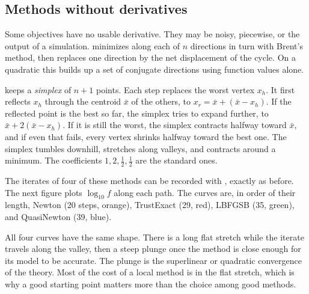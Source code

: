 \subsection{Methods without derivatives}

Some objectives have no usable derivative. They may be noisy, piecewise, or
the output of a simulation.  minimizes along each of \(n\)
directions in turn with Brent's method, then replaces one direction by the net
displacement of the cycle. On a quadratic this builds up a set of conjugate
directions using function values alone.

 keeps a \emph{simplex} of
\(n + 1\) points. Each step replaces the worst vertex \(x_h\). It first
reflects \(x_h\) through the centroid \(\bar x\) of the others, to
\(x_r = \bar x + (\bar x - x_h)\). If the reflected point is the best so far,
the simplex tries to expand further, to \(\bar x + 2(\bar x - x_h)\). If it is
still the worst, the simplex contracts halfway toward \(\bar x\), and if even
that fails, every vertex shrinks halfway toward the best one. The simplex
tumbles downhill, stretches along valleys, and contracts around a minimum. The
coefficients \(1, 2, \tfrac12, \tfrac12\) are the standard ones.

\begin{codepairs}
\end{codepairs}

The iterates of four of these methods can be recorded with ,
exactly as before. The next figure plots \(\log_{10} f\) along each path. The
curves are, in order of their length, Newton (20 steps, orange), TrustExact
(29, red), LBFGSB (35, green), and QuasiNewton (39, blue).


All four curves have the same shape. There is a long flat stretch while the
iterate travels along the valley, then a steep plunge once the method is close
enough for its model to be accurate. The plunge is the superlinear or
quadratic convergence of the theory. Most of the cost of a local method is in
the flat stretch, which is why a good starting point matters more than the
choice among good methods.

